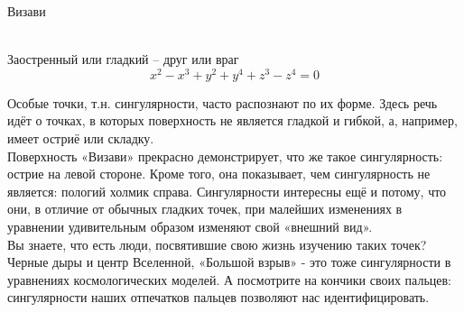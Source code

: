 \documentclass[ru]{./../../common/SurferDesc}%
\begin{document}
\footnotesize


\begin{surferPage}
  \begin{surferTitle}Визави\end{surferTitle} 
  \\
Заостренный или гладкий – друг или враг\\
\smallskip
\[x^2	- x^3+ y^2+ y^4+ z^3- z^4	=  0\]

\vspace{0.3cm}
Особые точки, т.н. сингулярности, часто распознают по их форме. Здесь речь идёт о точках, в которых поверхность не является гладкой и гибкой, а, например, имеет остриё или складку.\\
\vspace{0.3cm}
Поверхность «Визави» прекрасно демонстрирует, что же такое сингулярность: острие на левой стороне. Кроме того, она показывает, чем сингулярность не является: пологий холмик справа. Сингулярности интересны ещё и потому, что они, в отличие от обычных гладких точек, при малейших изменениях в уравнении удивительным образом изменяют свой «внешний вид». \\

\vspace{0.3cm}
Вы знаете, что есть люди, посвятившие свою жизнь изучению таких точек? Черные дыры и центр Вселенной, «Большой взрыв» - это тоже сингулярности в уравнениях космологических моделей. А посмотрите на кончики своих пальцев: сингулярности наших отпечатков пальцев позволяют нас идентифицировать.

  \begin{surferText}
     \end{surferText}
\end{surferPage}
\end{document}
